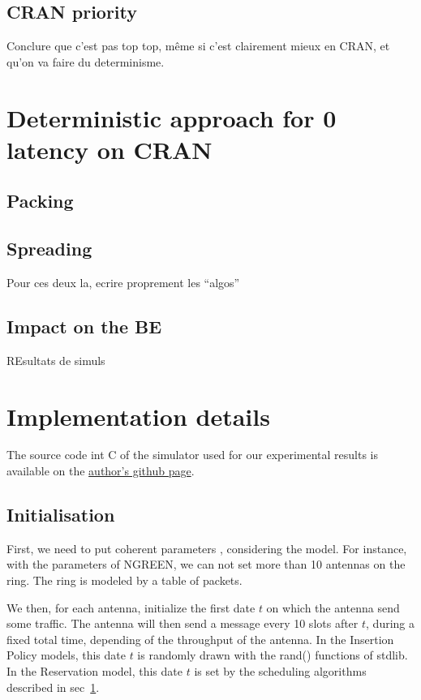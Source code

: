 \documentclass[a4paper,10pt]{article}
\begin{document}
  \subsection{CRAN priority}
  Conclure que c'est pas top top, même si c'est clairement mieux en CRAN, et qu'on va faire du determinisme.

\section{Deterministic approach for 0 latency on CRAN}
\label{det}
  \subsection{Packing}
  \subsection{Spreading}
  Pour ces deux la, ecrire proprement les ``algos''
  \subsection{Impact on the BE}
  REsultats de simuls
  
  
\section{ Implementation details}

	The source code int C of the simulator used for our experimental results is available on the \href{https://github.com/Mael-Guiraud/Ngreen.git}{ author's github page}.
	\subsection{Initialisation}
	First, we need to put coherent parameters , considering the model. For instance, with the parameters of NGREEN, we can not set more than 10 antennas on the ring. 
	The ring is modeled by a table of packets. 
	
	\begin{algorithm}[H]
	\end{algorithm}
	
	We then, for each antenna, initialize the first date $t$ on which the antenna send some traffic. The antenna will then send a message every 10 slots after $t$, during a fixed total time, depending of the throughput of the antenna.
	 In the Insertion Policy models, this date $t$ is randomly drawn with the rand() functions of stdlib. In the Reservation model, this date $t$ is set by the scheduling algorithms described in sec~\ref{det}.
	
\end{document}
